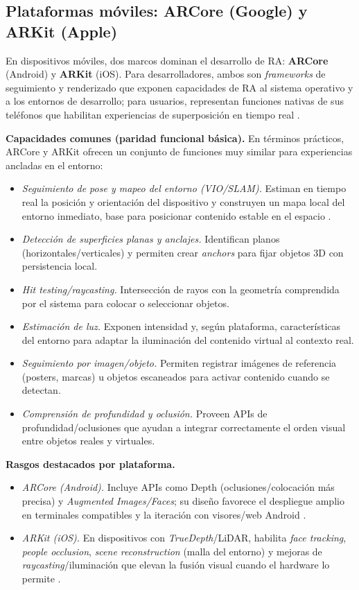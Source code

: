 \subsection*{Plataformas móviles: ARCore (Google) y ARKit (Apple)}

En dispositivos móviles, dos marcos dominan el desarrollo de RA: \textbf{ARCore} (Android) y \textbf{ARKit} (iOS). Para desarrolladores, ambos son \emph{frameworks} de seguimiento y renderizado que exponen capacidades de RA al sistema operativo y a los entornos de desarrollo; para usuarios, representan funciones nativas de sus teléfonos que habilitan experiencias de superposición en tiempo real \cite{Onirix2021ARKitARCore}.

\textbf{Capacidades comunes (paridad funcional básica).} En términos prácticos, ARCore y ARKit ofrecen un conjunto de funciones muy similar para experiencias ancladas en el entorno:
\begin{itemize}
  \item \emph{Seguimiento de pose y mapeo del entorno (VIO/SLAM).} Estiman en tiempo real la posición y orientación del dispositivo y construyen un mapa local del entorno inmediato, base para posicionar contenido estable en el espacio \cite{Onirix2021ARKitARCore}.
  \item \emph{Detección de superficies planas y anclajes.} Identifican planos (horizontales/verticales) y permiten crear \emph{anchors} para fijar objetos 3D con persistencia local.
  \item \emph{\emph{Hit testing}/raycasting.} Intersección de rayos con la geometría comprendida por el sistema para colocar o seleccionar objetos.
  \item \emph{Estimación de luz.} Exponen intensidad y, según plataforma, características del entorno para adaptar la iluminación del contenido virtual al contexto real.
  \item \emph{Seguimiento por imagen/objeto.} Permiten registrar imágenes de referencia (posters, marcas) u objetos escaneados para activar contenido cuando se detectan.
  \item \emph{Comprensión de profundidad y oclusión.} Proveen APIs de profundidad/oclusiones que ayudan a integrar correctamente el orden visual entre objetos reales y virtuales.
\end{itemize}

\textbf{Rasgos destacados por plataforma.}
\begin{itemize}
  \item \emph{ARCore (Android).} Incluye APIs como Depth (oclusiones/colocación más precisa) y \emph{Augmented Images/Faces}; su diseño favorece el despliegue amplio en terminales compatibles y la iteración con visores/web Android \cite{GoogleARCoreOverview}.
  \item \emph{ARKit (iOS).} En dispositivos con \emph{TrueDepth}/LiDAR, habilita \emph{face tracking}, \emph{people occlusion}, \emph{scene reconstruction} (malla del entorno) y mejoras de \emph{raycasting}/iluminación que elevan la fusión visual cuando el hardware lo permite \cite{AppleARKitOverview}.
\end{itemize}

